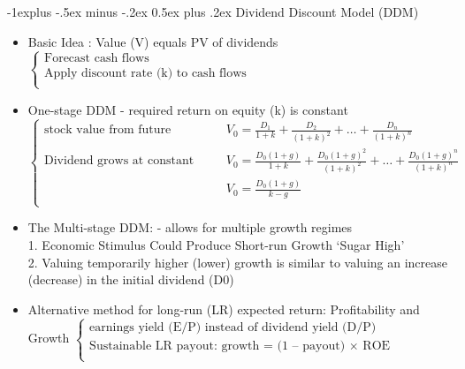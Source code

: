 \documentclass[10pt,landscape]{article}
\makeatletter
\renewcommand{\subsection}{\@startsection{subsection}{2}{0mm}%
                                {-1explus -.5ex minus -.2ex}%
                                {0.5ex plus .2ex}%
                                {\normalfont\normalsize\bfseries}}
\makeatother
\begin{document}
\begin{multicols}{2}
    \subsection{Dividend Discount Model (DDM)}
    \begin{itemize}
        \item Basic Idea : Value (V) equals PV of dividends\\
        	$
            \begin{cases}
                \text{Forecast cash flows}\\
                \text{Apply discount rate (k) to cash flows}\\
            \end{cases}
            $
        \item One-stage DDM - required return on equity (k) is constant\\
        	$
            \begin{cases}
                \text{stock value from future dividend}& \displaystyle V_0=\frac{D_1}{1+k}+\frac{D_2}{(1+k)^2}+\ldots+\frac{D_n}{(1+k)^n}\\
                \text{Dividend grows at constant rate}& \displaystyle V_0=\frac{D_0(1+g)}{1+k}+\frac{D_0(1+g)^2}{(1+k)^2}+\ldots+\frac{D_0(1+g)^n}{(1+k)^n}\\
                \text{} & \displaystyle V_0=\frac{D_0(1+g)}{k-g}\\
            \end{cases}
            $
        \item The Multi-stage DDM: - allows for multiple growth regimes\\
        	1. Economic Stimulus Could Produce Short-run Growth ‘Sugar High’\\
        	2. Valuing temporarily higher (lower) growth is similar to valuing an increase (decrease) in the initial dividend (D0)
        \item Alternative method for long-run (LR) expected return: Profitability and Growth 
        	$
            \begin{cases}
                \text{earnings yield (E/P) instead of dividend yield (D/P)}\\
                \text{Sustainable LR payout: growth = (1 – payout) $\times$ ROE }\\
            \end{cases}
            $
    \end{itemize}



\end{multicols}
\end{document}
